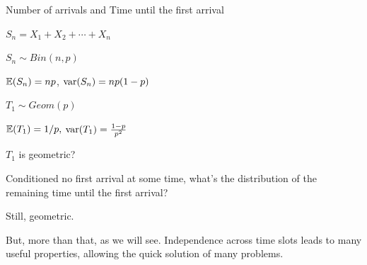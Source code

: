 \documentclass[fleqn,aspectratio=169]{beamer}
\begin{document}
\begin{frame}{Number of arrivals and Time until the first arrival}

{
\plitemsep 0.1in

\bci
\item<2-> $S_n = X_1 + X_2 +\cdots + X_n$

\item<3-> $S_n \sim Bin(n,p)$

\item<4-> $\mathbb{E}( S_n ) = np$, $\text{var}( S_n ) = np(1-p)$
\eci

\bigskip
{}
\bci
\item<6-> $T_1 \sim Geom(p)$
\item<7-> $\mathbb{E}( T_1 ) = 1/p,$ $\text{var}( T_1 ) = \frac{1-p}{p^2}$
\eci
}
{
\plitemsep 0.1in
\bci
\item<8-> $T_1$ is geometric? 

\item<9-> Conditioned no first arrival at some time, what's the distribution of the remaining time until the first arrival? 

\item<9-> Still, geometric.

\item<10-> But, more than that, as we will see. Independence across time slots leads to many useful properties, allowing the quick solution of many problems. 

\eci

}

\end{frame}
\end{document}
